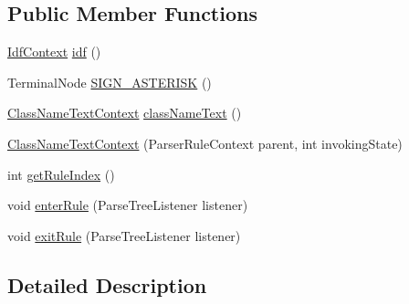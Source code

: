 \subsection*{Public Member Functions}
\begin{DoxyCompactItemize}
\item 
\hyperlink{classgov_1_1nasa_1_1jpf_1_1inspector_1_1server_1_1expression_1_1parser_1_1_expression_grammar_parser_1_1_idf_context}{Idf\+Context} \hyperlink{classgov_1_1nasa_1_1jpf_1_1inspector_1_1server_1_1expression_1_1parser_1_1_expression_grammar_pa73f78f15ab35f00cdc76079d9a864524_ae019599b45fb658635e235f69d4458fb}{idf} ()
\item 
Terminal\+Node \hyperlink{classgov_1_1nasa_1_1jpf_1_1inspector_1_1server_1_1expression_1_1parser_1_1_expression_grammar_pa73f78f15ab35f00cdc76079d9a864524_ad3dbbe11d1bcdc2587856a172cbc7024}{S\+I\+G\+N\+\_\+\+A\+S\+T\+E\+R\+I\+SK} ()
\item 
\hyperlink{classgov_1_1nasa_1_1jpf_1_1inspector_1_1server_1_1expression_1_1parser_1_1_expression_grammar_pa73f78f15ab35f00cdc76079d9a864524}{Class\+Name\+Text\+Context} \hyperlink{classgov_1_1nasa_1_1jpf_1_1inspector_1_1server_1_1expression_1_1parser_1_1_expression_grammar_pa73f78f15ab35f00cdc76079d9a864524_abee7a9f389866004069ba605015a3b27}{class\+Name\+Text} ()
\item 
\hyperlink{classgov_1_1nasa_1_1jpf_1_1inspector_1_1server_1_1expression_1_1parser_1_1_expression_grammar_pa73f78f15ab35f00cdc76079d9a864524_a479f0e3d2d56b12d98f910460db9545a}{Class\+Name\+Text\+Context} (Parser\+Rule\+Context parent, int invoking\+State)
\item 
int \hyperlink{classgov_1_1nasa_1_1jpf_1_1inspector_1_1server_1_1expression_1_1parser_1_1_expression_grammar_pa73f78f15ab35f00cdc76079d9a864524_a534d4c01440615fe350c42d6a7646ff4}{get\+Rule\+Index} ()
\item 
void \hyperlink{classgov_1_1nasa_1_1jpf_1_1inspector_1_1server_1_1expression_1_1parser_1_1_expression_grammar_pa73f78f15ab35f00cdc76079d9a864524_a1ddf2cb24285474afe38b2c8debc7555}{enter\+Rule} (Parse\+Tree\+Listener listener)
\item 
void \hyperlink{classgov_1_1nasa_1_1jpf_1_1inspector_1_1server_1_1expression_1_1parser_1_1_expression_grammar_pa73f78f15ab35f00cdc76079d9a864524_a4b4f18cf1f799e95ccc7be35e615351e}{exit\+Rule} (Parse\+Tree\+Listener listener)
\end{DoxyCompactItemize}


\subsection{Detailed Description}


